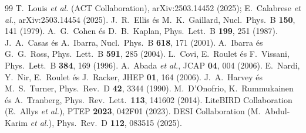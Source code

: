\documentclass[11pt,a4paper]{article}
\begin{document}
\begin{thebibliography}{99}
 T.~Louis \textit{et al.} (ACT Collaboration), arXiv:2503.14452 (2025); E.~Calabrese \textit{et al.}, arXiv:2503.14454 (2025).
 J.~R.~Ellis és M.~K.~Gaillard, Nucl.\ Phys.\ B \textbf{150}, 141 (1979).
 A.~G.~Cohen és D.~B.~Kaplan, Phys.\ Lett.\ B \textbf{199}, 251 (1987).
 J.~A.~Casas és A.~Ibarra, Nucl.\ Phys.\ B \textbf{618}, 171 (2001).
 A.~Ibarra és G.~G.~Ross, Phys.\ Lett.\ B \textbf{591}, 285 (2004).
 L.~Covi, E.~Roulet és F.~Vissani, Phys.\ Lett.\ B \textbf{384}, 169 (1996).
 A.~Abada \textit{et al.}, JCAP \textbf{04}, 004 (2006).
 E.~Nardi, Y.~Nir, E.~Roulet és J.~Racker, JHEP \textbf{01}, 164 (2006).
 J.~A.~Harvey és M.~S.~Turner, Phys.\ Rev.\ D \textbf{42}, 3344 (1990).
 M.~D'Onofrio, K.~Rummukainen és A.~Tranberg, Phys.\ Rev.\ Lett.\ \textbf{113}, 141602 (2014).
 LiteBIRD Collaboration (E.~Allys \textit{et al.}), PTEP \textbf{2023}, 042F01 (2023).
 DESI Collaboration (M.~Abdul-Karim \textit{et al.}), Phys.\ Rev.\ D \textbf{112}, 083515 (2025).
\end{thebibliography}
\endgroup
\end{document}
